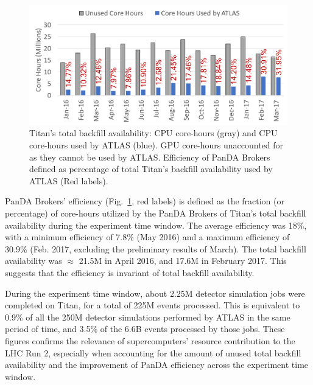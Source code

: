\begin{figure}[!t]
    \includegraphics[clip,width=\columnwidth]{figures/backfill_consumption.pdf}
    \vspace{-0.3in}
    \caption{Titan's total backfill availability: CPU core-hours (gray) and
    CPU core-hours used by ATLAS (blue). GPU core-hours unaccounted for as
    they cannot be used by ATLAS\@. Efficiency of PanDA Brokers defined as
    percentage of total Titan's backfill availability used by ATLAS (Red
    labels).}\label{fig:backfill-utilization}
\end{figure}

PanDA Brokers' efficiency (Fig.~\ref{fig:backfill-utilization}, red labels) is
defined as the fraction (or percentage) of core-hours utilized by the PanDA
Brokers of Titan’s total backfill availability during the experiment time
window. The  average efficiency was 18\%, with a minimum efficiency
of 7.8\% (May 2016) and a maximum efficiency of 30.9\% (Feb. 2017, excluding
the preliminary results of March). The total backfill availability was
$\approx$ 21.5M in April 2016, and 17.6M in February 2017. This suggests that
the efficiency is invariant of total backfill availability.



During the experiment time window, about 2.25M detector simulation jobs were
completed on Titan, for a total of 225M events processed. This is equivalent
to 0.9\% of all the 250M detector simulations performed by ATLAS in the same
period of time, and 3.5\% of the 6.6B events processed by those jobs. These
figures confirms the relevance of supercomputers' resource contribution to
the LHC Run 2, especially when accounting for the amount of unused total
backfill availability and the improvement of PanDA efficiency across the
experiment time window.

